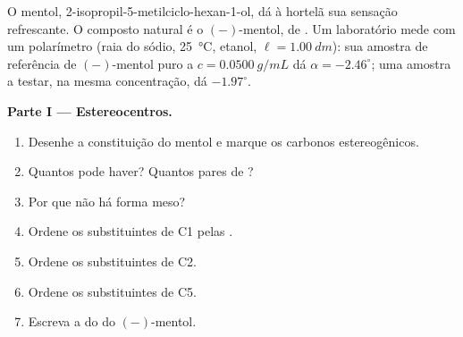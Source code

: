 \begin{problem}
\label{pb:b1:stereochemistry-in-depth:1}
O mentol, 2-isopropil-5-metilciclo-hexan-1-ol, dá à hortelã sua sensação
refrescante. O composto natural é o $(-)$-mentol, de 
. Um laboratório mede com um polarímetro (raia do sódio,
\qty{25}{\celsius}, etanol, $\ell = \qty{1.00}{dm}$): sua amostra de
referência de $(-)$-mentol puro a $c = \qty{0.0500}{g/mL}$ dá $\alpha =
-2.46^\circ$; uma amostra a testar, na mesma concentração, dá
$-1.97^\circ$.

\medskip
\noindent\textbf{Parte I --- Estereocentros.}
\begin{enumerate}
  \item Desenhe a constituição do mentol e marque os carbonos
        estereogênicos.
  \item Quantos  pode haver? Quantos pares de
        ?
  \item Por que não há forma meso?
  \item Ordene os substituintes de C1 pelas .
  \item Ordene os substituintes de C2.
  \item Ordene os substituintes de C5.
  \item Escreva a  do  do $(-)$-mentol.
\end{enumerate}


\end{problem}
